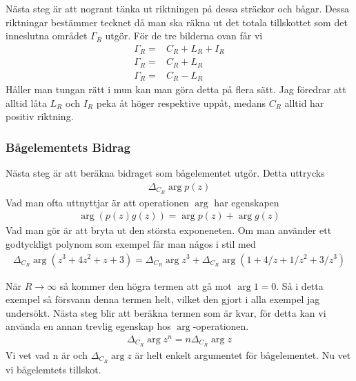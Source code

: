 Nästa steg är att nogrant tänka ut riktningen på dessa sträckor och bågar. Dessa riktningar bestämmer tecknet då man ska räkna ut det totala tillskottet som det inneslutna området $\Gamma_R$ utgör. För de tre bilderna ovan får vi
\begin{align*}
	\Gamma_R =& C_R + L_R + I_R \\
	\Gamma_R =& C_R + L_R \\
	\Gamma_R =& C_R - L_R
\end{align*}
Håller man tungan rätt i mun kan man göra detta på flera sätt. Jag föredrar att alltid låta $L_R$ och $I_R$ peka åt höger respektive uppåt, medans $C_R$ alltid har positiv riktning. \\

\subsubsection*{Bågelementets Bidrag}
Nästa steg är att beräkna bidraget som bågelementet utgör. Detta uttrycks
\begin{align*}
	\Delta_{C_R} \arg p(z)
\end{align*}
Vad man ofta uttnyttjar är att operationen $\arg$ har egenskapen 
\begin{align*}
	\arg \left( p(z) g(z) \right) = \arg p(z) + \arg g(z)
\end{align*}
Vad man gör är att bryta ut den största exponeneten. Om man använder ett godtyckligt polynom som exempel får man någos i stil med
\begin{align*}
	\Delta_{C_R} \arg \left( z^3 + 4z^2 + z + 3 \right) = \Delta_{C_R} \arg z^3 + \Delta_{C_R}\arg \left( 1+4/z+1/z^2 + 3/z^3 \right)
\end{align*}

När $R \rightarrow \infty$ så kommer den högra termen att gå mot $\arg 1 = 0$. Så i detta exempel så försvann denna termen helt, vilket den gjort i alla exempel jag undersökt. Nästa steg blir att beräkna termen som är kvar, för detta kan vi använda en annan trevlig egenskap hos $\arg$-operationen.
\begin{align*}
	\Delta_{C_R} \arg z^n = n \Delta_{C_R} \arg z 	
\end{align*}
Vi vet vad n är och $\Delta_{C_R} \arg z$ är helt enkelt argumentet för bågelementet. Nu vet vi bågelemtets tillskot. \\


